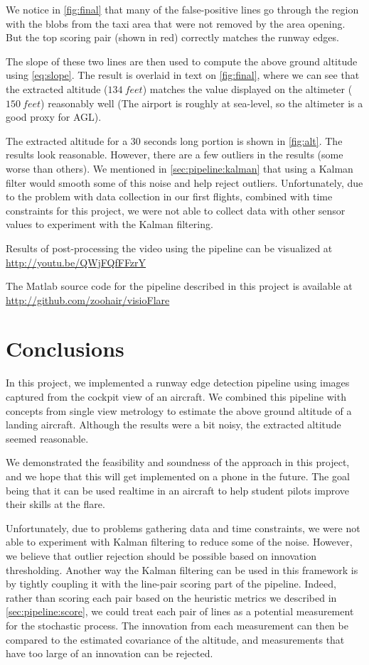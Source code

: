 \documentclass[letterpaper, conference]{IEEEtran}  %
\begin{document}
We notice in \cref{fig:final} that many of the false-positive lines go through the region with the blobs from the taxi area that were not removed by the area opening. But the top scoring pair (shown in red) correctly matches the runway edges. 

The slope of these two lines are then used to compute the above ground altitude using \cref{eq:slope}. The result is overlaid in text on \cref{fig:final}, where we can see that the extracted altitude ($\SI{134}{feet}$) matches the value displayed on the altimeter ($\SI{150}{feet}$) reasonably well (The airport is roughly at sea-level, so the altimeter is a good proxy for AGL).


The extracted altitude for a 30 seconds long portion is shown in \cref{fig:alt}. The results look reasonable. However, there are a few outliers in the results (some worse than others). We mentioned in \cref{sec:pipeline:kalman} that using a Kalman filter would smooth some of this noise and help reject outliers. Unfortunately, due to the problem with data collection in our first flights, combined with time constraints for this project, we were not able to collect data with other sensor values to experiment with the Kalman filtering.

Results of post-processing the video using the pipeline can be visualized at \url{http://youtu.be/QWjFQfFFzrY}

The Matlab source code for the pipeline described in this project is available at \url{http://github.com/zoohair/visioFlare}

\section{Conclusions}
In this project, we implemented a runway edge detection pipeline using images captured from the cockpit view of an aircraft. We combined this pipeline with concepts from single view metrology to estimate the above ground altitude of a landing aircraft. Although the results were a bit noisy, the extracted altitude seemed reasonable.

We demonstrated the feasibility and soundness of the approach in this project, and we hope that this will get implemented on a phone in the future. The goal being that it can be used realtime in an aircraft to help student pilots improve their skills at the flare.

Unfortunately, due to problems gathering data and time constraints, we were not able to experiment with Kalman filtering to reduce some of the noise. However, we believe that outlier rejection should be possible based on innovation thresholding. Another way the Kalman filtering can be used in this framework is by tightly coupling it with the line-pair scoring part of the pipeline. Indeed, rather than scoring each pair based on the heuristic metrics we described in \cref{sec:pipeline:score}, we could treat each pair of lines as a potential measurement for the stochastic process. The innovation from each measurement can then be compared to the estimated covariance of the altitude, and measurements that have too large of an innovation can be rejected.

\newpage
\printbibliography
\end{document}
